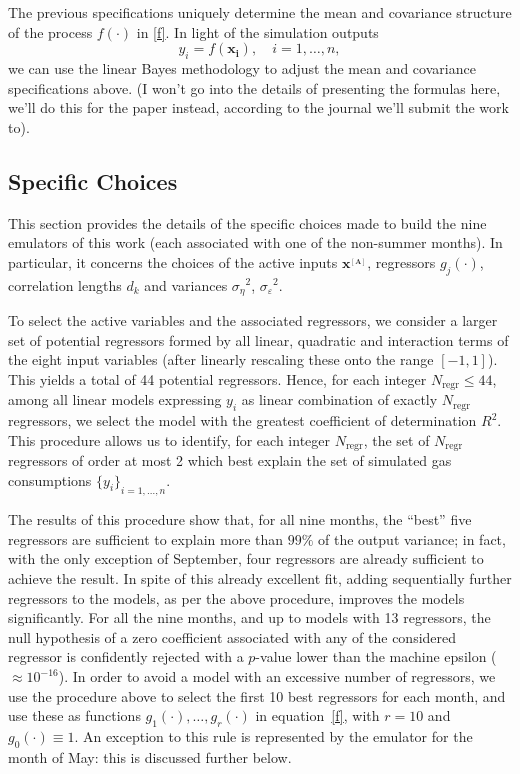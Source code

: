 \documentclass[a4paper, 12pt]{article}
\newcommand{\bd}[1]{\boldsymbol{#1}}
\newcommand{\A}{{_{[A]}}}
\newcommand{\xA}{\bd{x^\A}}
\newcommand{\eps}{\varepsilon}
\newcommand{\Nr}{N_\text{regr}}
\begin{document}
The previous specifications uniquely determine the mean and covariance structure of the process $f(\cdot)$ in \eqref{f}. In light of the simulation outputs
\begin{equation*}
 y_i = f(\bd{x_i}), \quad i=1, \dots, n,
\end{equation*}
we can use the linear Bayes methodology to adjust the mean and covariance specifications above. (I won't go into the details of presenting the formulas here, we'll do this for the paper instead, according to the journal we'll submit the work to).

\subsection{Specific Choices}\label{Sec_Choices}
This section provides the details of the specific choices made to build the nine emulators of this work (each associated with one of the non-summer months). In particular, it concerns the choices of the active inputs $\xA$, regressors $g_j(\cdot)$, correlation lengths $d_k$ and variances ${\sigma_\eta}^2$, ${\sigma_\eps}^2$. 


To select the active variables and the associated regressors, we consider a larger set of potential regressors formed by all linear, quadratic and interaction terms of the eight input variables (after linearly rescaling these onto the range $[-1,1]$). This yields a total of 44 potential regressors. Hence, for each integer $\Nr \leq 44$, among all linear models expressing $y_i$ as linear combination of exactly $\Nr$ regressors, we select the model with the greatest coefficient of determination $R^2$.
This procedure allows us to identify, for each integer $\Nr$, the set of $\Nr$ regressors of order at most 2 which best explain the set of simulated gas consumptions ${\{y_i\}}_{i=1, \dots, n}$.


The results of this procedure show that, for all nine months, the ``best'' five regressors are sufficient to explain more than $99\%$ of the output variance; in fact, with the only exception of September, four regressors are already sufficient to achieve the result. In spite of this already excellent fit, adding sequentially further regressors to the models, as per the above procedure, improves the models significantly. For all the nine months, and up to models with 13 regressors, the null hypothesis of a zero coefficient associated with any of the considered regressor is confidently rejected with a $p$-value lower than the machine epsilon ($\approx 10^{-16}$). 
In order to avoid a model with an excessive number of regressors, we use the procedure above to select the first 10 best regressors for each month, and use these as functions $g_1(\cdot), \dots, g_r(\cdot)$ in equation~\eqref{f}, with $r=10$ and $g_0(\cdot) \equiv 1$. An exception to this rule is represented by the emulator for the month of May: this is discussed further below.
\end{document}
